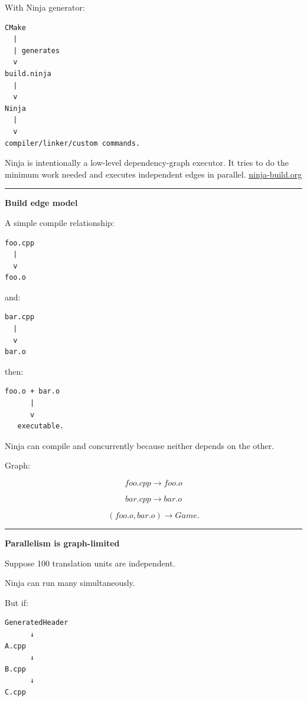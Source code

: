 With Ninja generator:

\begin{verbatim}
CMake
  |
  | generates
  v
build.ninja
  |
  v
Ninja
  |
  v
compiler/linker/custom commands.
\end{verbatim}

Ninja is intentionally a low-level dependency-graph executor. It tries to do the minimum work needed and executes independent edges in parallel. \href{https://ninja-build.org/manual.html?utm_source=chatgpt.com}{ninja-build.org}

\begin{center}\rule{0.5\linewidth}{0.5pt}\end{center}

\textbf{Build edge model}

A simple compile relationship:

\begin{verbatim}
foo.cpp
  |
  v
foo.o
\end{verbatim}

and:

\begin{verbatim}
bar.cpp
  |
  v
bar.o
\end{verbatim}

then:

\begin{verbatim}
foo.o + bar.o
      |
      v
   executable.
\end{verbatim}

Ninja can compile  and  concurrently because neither depends on the other.

Graph:

\[
foo.cpp\rightarrow foo.o
\]

\[
bar.cpp\rightarrow bar.o
\]

\[
(foo.o,bar.o)\rightarrow Game.
\]

\begin{center}\rule{0.5\linewidth}{0.5pt}\end{center}

\textbf{Parallelism is graph-limited}

Suppose 100 translation units are independent.

Ninja can run many simultaneously.

But if:

\begin{verbatim}
GeneratedHeader
      ↓
A.cpp
      ↓
B.cpp
      ↓
C.cpp
\end{verbatim}

